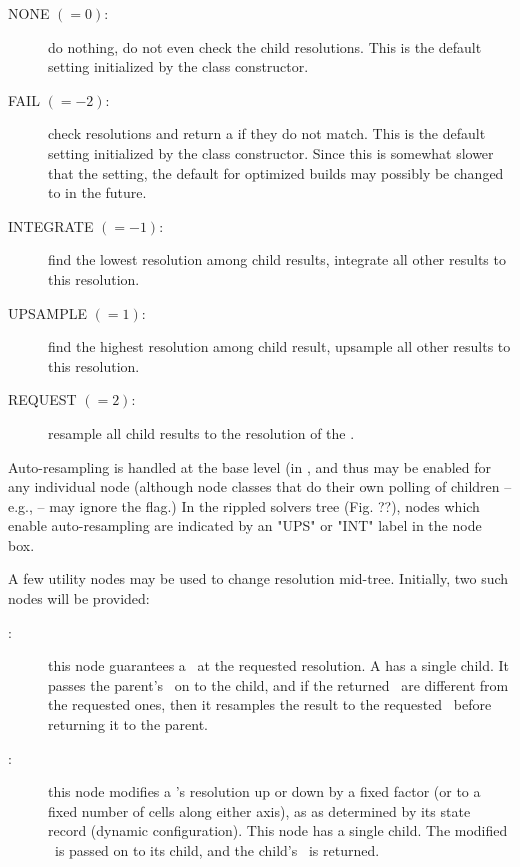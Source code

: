   \begin{description}

  \item[NONE $(=0)$:] do nothing, do not even check the child resolutions. This
  is the default setting initialized by the  class constructor.

  \item[FAIL $(=-2)$:] check resolutions and return a  if they do
  not match. This is the default setting initialized by the  class
  constructor. Since this is somewhat slower that the  setting, the
  default for optimized builds may possibly be changed to  in the
  future.

  \item[INTEGRATE $(=-1)$:] find the lowest resolution among child results,
  integrate all other results to this resolution.

  \item[UPSAMPLE $(=1)$:] find the highest resolution among child result,
  upsample all other results to this resolution.

  \item[REQUEST $(=2)$:] resample all child results to the resolution of the
  \Request.

  \end{description}
    
  Auto-resampling is handled at the base  level (in
  , and thus may be enabled for any individual node
  (although node classes that do their own polling of children -- e.g.,
   -- may ignore the flag.) In the rippled solvers tree (Fig. ??),
  nodes which enable auto-resampling are indicated by an "UPS" or "INT" label
  in the node box. 

  \item A few utility nodes may be used to change resolution mid-tree.
  Initially, two such nodes will be provided:

    \begin{description}
    
    \item[:] this node guarantees a \Result\ at the requested
    resolution. A  has a single child. It passes the parent's
    \Request\ on to the child, and if the returned \Cells\ are different from
    the requested ones, then it resamples the result to the requested \Cells\
    before returning it to the parent.

    \item[:] this node modifies a \Request's resolution up or down
    by a fixed factor (or to a fixed number of cells along either axis), as as
    determined by its state record (dynamic configuration). This node has a
    single child. The modified \Request\ is passed on to its child, and the
    child's \Result\ is returned.

    \end{description}
    
